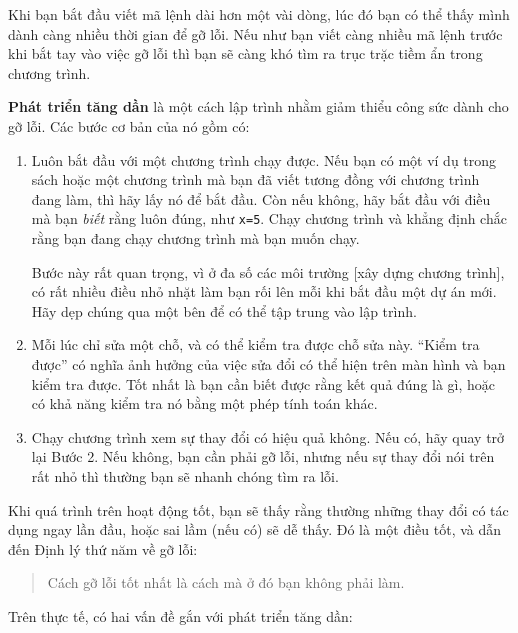 \documentclass[12pt]{book}
\begin{document}
Khi bạn bắt đầu viết mã lệnh dài hơn một vài dòng, lúc đó bạn
có thể thấy mình dành càng nhiều thời gian để gỡ lỗi. Nếu như
bạn viết càng nhiều mã lệnh trước khi bắt tay vào việc gỡ lỗi
thì bạn sẽ càng khó tìm ra trục trặc tiềm ẩn trong chương trình.

{\bf Phát triển tăng dần} là một cách lập trình nhằm giảm thiểu
công sức dành cho gỡ lỗi. Các bước cơ bản của nó gồm có:

\begin{enumerate}

\item Luôn bắt đầu với một chương trình chạy được. Nếu bạn 
có một ví dụ trong sách hoặc một chương trình mà bạn đã viết
tương đồng với chương trình đang làm, thì hãy lấy nó để bắt
đầu. Còn nếu không, hãy bắt đầu với điều mà bạn {\em biết}
rằng luôn đúng, như {\tt x=5}.  Chạy chương trình và khẳng định
chắc rằng bạn đang chạy chương trình mà bạn muốn chạy.

Bước này rất quan trọng, vì ở đa số các môi trường [xây dựng 
chương trình], có rất nhiều điều nhỏ nhặt làm bạn rối lên mỗi
khi bắt đầu một dự án mới. Hãy dẹp chúng qua một bên để
có thể tập trung vào lập trình.

\item Mỗi lúc chỉ sửa một chỗ, và có thể kiểm tra được chỗ sửa này.
``Kiểm tra được'' có nghĩa ảnh hưởng của việc sửa đổi có thể 
hiện trên màn hình và bạn kiểm tra được. Tốt nhất là bạn cần
biết được rằng kết quả đúng là gì, hoặc có khả năng kiểm tra nó
bằng một phép tính toán khác.

\item Chạy chương trình xem sự thay đổi có hiệu quả không. Nếu
có, hãy quay trở lại Bước 2. Nếu không, bạn cần phải gỡ lỗi, nhưng
nếu sự thay đổi nói trên rất nhỏ thì thường bạn sẽ nhanh chóng
tìm ra lỗi.

\end{enumerate}

Khi quá trình trên hoạt động tốt, bạn sẽ thấy rằng thường những
thay đổi có tác dụng ngay lần đầu, hoặc sai lầm (nếu có) sẽ dễ 
thấy. Đó là một điều tốt, và dẫn đến Định lý thứ năm về gỡ lỗi:

\begin{quote}
Cách gỡ lỗi tốt nhất là cách mà ở đó bạn không phải làm.
\end{quote}

Trên thực tế, có hai vấn đề gắn với phát triển tăng dần:
\end{document}
